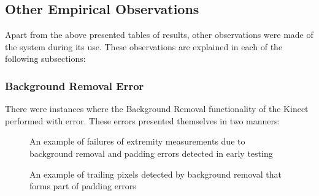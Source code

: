 \subsection{Other Empirical Observations}

Apart from the above presented tables of results, other observations were made of the system during its use. These observations are explained in each of the following subsections:

\subsubsection{Background Removal Error} 
There were instances where the Background Removal functionality of the Kinect performed with error. These errors presented themselves in two manners:


\begin{figure}[ht]
	\centering
	{%
		\setlength{\fboxsep}{0pt}%
		\setlength{\fboxrule}{1pt}%
		}
	\caption{An example of failures of extremity measurements due to background removal and padding errors detected in early testing}
	\label{fig:errorExample}
\end{figure}

\begin{figure}[ht]
	\centering
	{%
		\setlength{\fboxsep}{0pt}%
		\setlength{\fboxrule}{1pt}%
		}
	\caption{An example of trailing pixels detected by background removal that forms part of padding errors}
	\label{fig:uncertaintyLeft4}
\end{figure}

